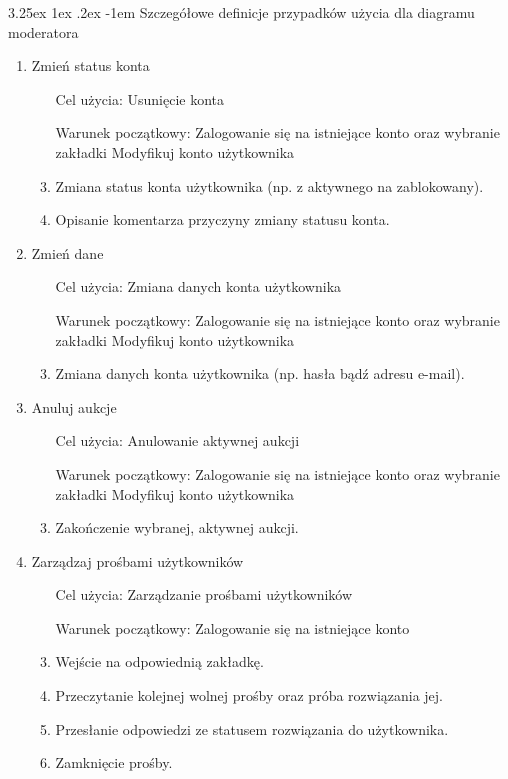 \documentclass[10pt,titlepage]{article} %
\makeatletter
\renewcommand{\normalsize}{\fontsize{8pt}{10pt}\selectfont} %
\renewcommand\paragraph{\@startsection{paragraph}{5}{\z@}%
  {3.25ex \@plus1ex \@minus.2ex}%
  {-1em}%
  {\normalfont\normalsize\bfseries}}
\makeatother
\begin{document}
\paragraph{Szczegółowe definicje przypadków użycia dla diagramu moderatora}\mbox{}\\
\begin{enumerate}[1.]

\item Zmień status konta
\begin{enumerate}
\item[Cel użycia:] Usunięcie konta
\item[Warunek początkowy:] Zalogowanie się na istniejące konto oraz wybranie zakładki Modyfikuj konto użytkownika
\item Zmiana status konta użytkownika (np. z aktywnego na zablokowany).
\item Opisanie komentarza przyczyny zmiany statusu konta.
\end{enumerate}

\item Zmień dane
\begin{enumerate}
\item[Cel użycia:] Zmiana danych konta użytkownika
\item[Warunek początkowy:] Zalogowanie się na istniejące konto oraz wybranie zakładki Modyfikuj konto użytkownika
\item Zmiana danych konta użytkownika (np. hasła bądź adresu e-mail).
\end{enumerate}

\item Anuluj aukcje
\begin{enumerate}
\item[Cel użycia:] Anulowanie aktywnej aukcji
\item[Warunek początkowy:] Zalogowanie się na istniejące konto oraz wybranie zakładki Modyfikuj konto użytkownika
\item Zakończenie wybranej, aktywnej aukcji.
\end{enumerate}

\item Zarządzaj prośbami użytkowników
\begin{enumerate}
\item[Cel użycia:] Zarządzanie prośbami użytkowników
\item[Warunek początkowy:] Zalogowanie się na istniejące konto
\item Wejście na odpowiednią zakładkę.
\item Przeczytanie kolejnej wolnej prośby oraz próba rozwiązania jej.
\item Przesłanie odpowiedzi ze statusem rozwiązania do użytkownika.
\item Zamknięcie prośby.
\end{enumerate}


\end{enumerate}
\end{document}
